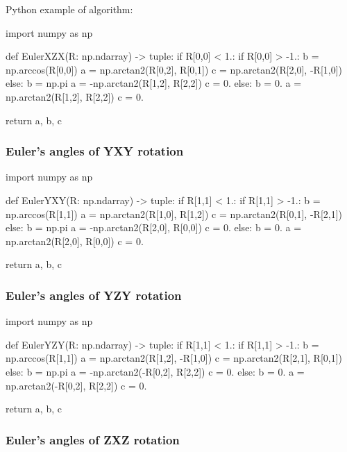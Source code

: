     Python example of algorithm:

\begin{python}
import numpy as np

def EulerXZX(R: np.ndarray) -> tuple:
    if R[0,0] < 1.:
        if R[0,0] > -1.:
            b = np.arccos(R[0,0])
            a = np.arctan2(R[0,2], R[0,1])
            c = np.arctan2(R[2,0], -R[1,0])
        else:
            b = np.pi
            a = -np.arctan2(R[1,2], R[2,2])
            c = 0.
    else:
        b = 0.
        a = np.arctan2(R[1,2], R[2,2])
        c = 0.

    return a, b, c
\end{python}

\subsubsection{Euler's angles of \textbf{YXY} rotation}

\begin{python}
import numpy as np

def EulerYXY(R: np.ndarray) -> tuple:
    if R[1,1] < 1.:
        if R[1,1] > -1.:
            b = np.arccos(R[1,1])
            a = np.arctan2(R[1,0], R[1,2])
            c = np.arctan2(R[0,1], -R[2,1])
        else:
            b = np.pi
            a = -np.arctan2(R[2,0], R[0,0])
            c = 0.
    else:
        b = 0.
        a = np.arctan2(R[2,0], R[0,0])
        c = 0.

    return a, b, c
\end{python}

\subsubsection{Euler's angles of \textbf{YZY} rotation}

\begin{python}
import numpy as np

def EulerYZY(R: np.ndarray) -> tuple:
    if R[1,1] < 1.:
        if R[1,1] > -1.:
            b = np.arccos(R[1,1])
            a = np.arctan2(R[1,2], -R[1,0])
            c = np.arctan2(R[2,1], R[0,1])
        else:
            b = np.pi
            a = -np.arctan2(-R[0,2], R[2,2])
            c = 0.
    else:
        b = 0.
        a = np.arctan2(-R[0,2], R[2,2])
        c = 0.

    return a, b, c
\end{python}

\subsubsection{Euler's angles of \textbf{ZXZ} rotation}

